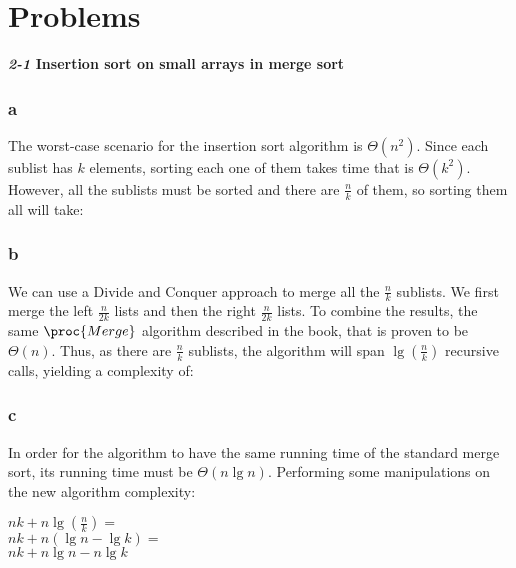 \documentclass[8pt,a4paper]{article}
\begin{document}
\section*{Problems}

\begin{framed}
\textbf{\textit{2-1} Insertion sort on small arrays in merge sort}
\end{framed}

\subsubsection*{a}

The worst-case scenario for the insertion sort algorithm is $\Theta(n^{2})$.
Since each sublist has $k$ elements, sorting each one of them takes time
that is $\Theta(k^{2})$. However, all the sublists must be sorted and there
are $\frac{n}{k}$ of them, so sorting them all will take:

\begin{center}
\end{center}

\subsubsection*{b}

We can use a Divide and Conquer approach to merge all the $\frac{n}{k}$ sublists.
We first merge the left $\frac{n}{2k}$ lists and then the right $\frac{n}{2k}$ lists.
To combine the results, the same $\proc{Merge}$ algorithm described in the book, that
is proven to be $\Theta(n)$. Thus, as there are $\frac{n}{k}$ sublists, the algorithm
will span $\lg (\frac{n}{k})$ recursive calls, yielding a complexity of:

\begin{center}
\end{center}

\subsubsection*{c}

In order for the algorithm to have the same running time of the standard merge sort,
its running time must be $\Theta(n \lg n)$. Performing some manipulations on the
new algorithm complexity:

\begin{center}
$nk + n \lg (\frac{n}{k}) =$ \\
$nk + n(\lg n - \lg k) =$ \\
$nk + n \lg n - n \lg k$
\end{center}
\end{document}
